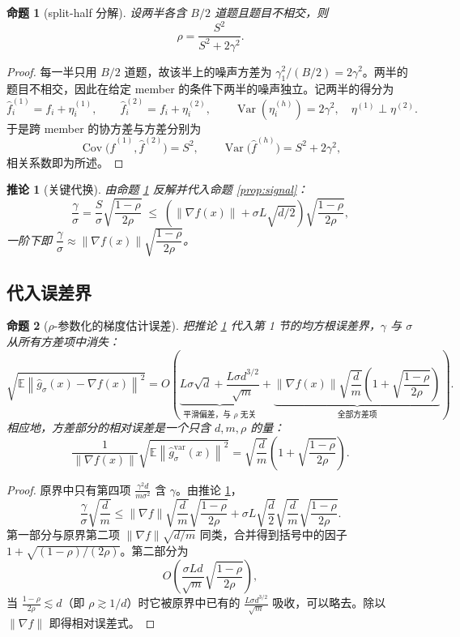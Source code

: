 \documentclass[UTF8]{ctexart}
\newtheorem{proposition}{命题}
\newtheorem{corollary}{推论}
\begin{document}
\begin{proposition}[split-half 分解]
\label{prop:rho}
设两半各含 $B/2$ 道题且题目不相交，则
\[
\boxed{
\rho
=
\frac{S^2}{S^2 + 2\gamma^2}.
}
\]
\end{proposition}

\begin{proof}
每一半只用 $B/2$ 道题，故该半上的噪声方差为 $\gamma_1^2/(B/2) = 2\gamma^2$。两半的题目不相交，因此在给定 member 的条件下两半的噪声独立。记两半的得分为
\[
\widehat f_i^{(1)} = f_i + \eta_i^{(1)},
\qquad
\widehat f_i^{(2)} = f_i + \eta_i^{(2)},
\qquad
\operatorname{Var}(\eta_i^{(h)}) = 2\gamma^2,
\quad
\eta^{(1)}\perp\eta^{(2)}.
\]
于是跨 member 的协方差与方差分别为
\[
\operatorname{Cov}\big(\widehat f^{(1)},\widehat f^{(2)}\big) = S^2,
\qquad
\operatorname{Var}\big(\widehat f^{(h)}\big) = S^2 + 2\gamma^2,
\]
相关系数即为所述。
\end{proof}

\begin{corollary}[关键代换]
\label{cor:sub}
由命题 \ref{prop:rho} 反解并代入命题 \ref{prop:signal}：
\[
\boxed{
\frac{\gamma}{\sigma}
=
\frac{S}{\sigma}\sqrt{\frac{1-\rho}{2\rho}}
\;\leq\;
\left(\|\nabla f(x)\| + \sigma L\sqrt{d/2}\right)
\sqrt{\frac{1-\rho}{2\rho}},
}
\]
一阶下即 $\dfrac{\gamma}{\sigma}\approx\|\nabla f(x)\|\sqrt{\dfrac{1-\rho}{2\rho}}$。
\end{corollary}

\subsection{代入误差界}

\begin{proposition}[$\rho$-参数化的梯度估计误差]
\label{prop:bound}
把推论 \ref{cor:sub} 代入第 1 节的均方根误差界，$\gamma$ 与 $\sigma$ 从所有方差项中消失：
\[
\boxed{
\sqrt{\mathbb E\left\|\widehat g_\sigma(x)-\nabla f(x)\right\|^2}
=
O\left(
\underbrace{L\sigma\sqrt d + \frac{L\sigma d^{3/2}}{\sqrt m}}_{\text{平滑偏差，与 }\rho\text{ 无关}}
+
\underbrace{\|\nabla f(x)\|\sqrt{\frac dm}\left(1+\sqrt{\frac{1-\rho}{2\rho}}\right)}_{\text{全部方差项}}
\right).
}
\]
相应地，方差部分的\emph{相对}误差是一个只含 $d,m,\rho$ 的量：
\[
\boxed{
\frac{1}{\|\nabla f(x)\|}
\sqrt{\mathbb E\left\|\widehat g_\sigma^{\mathrm{var}}(x)\right\|^2}
=
\sqrt{\frac dm}\left(1+\sqrt{\frac{1-\rho}{2\rho}}\right).
}
\]
\end{proposition}

\begin{proof}
原界中只有第四项 $\frac{\gamma^2 d}{m\sigma^2}$ 含 $\gamma$。由推论 \ref{cor:sub}，
\[
\frac{\gamma}{\sigma}\sqrt{\frac dm}
\leq
\|\nabla f\|\sqrt{\frac dm}\sqrt{\frac{1-\rho}{2\rho}}
+
\sigma L\sqrt{\frac d2}\sqrt{\frac dm}\sqrt{\frac{1-\rho}{2\rho}} .
\]
第一部分与原界第二项 $\|\nabla f\|\sqrt{d/m}$ 同类，合并得到括号中的因子 $1+\sqrt{(1-\rho)/(2\rho)}$。第二部分为
\[
O\!\left(\frac{\sigma L d}{\sqrt m}\sqrt{\frac{1-\rho}{2\rho}}\right),
\]
当 $\frac{1-\rho}{2\rho}\lesssim d$（即 $\rho\gtrsim 1/d$）时它被原界中已有的 $\frac{L\sigma d^{3/2}}{\sqrt m}$ 吸收，可以略去。除以 $\|\nabla f\|$ 即得相对误差式。
\end{proof}
\end{document}
